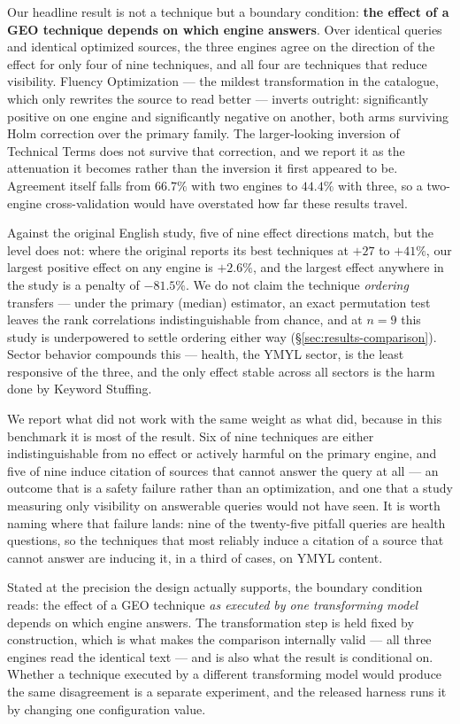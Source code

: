 \documentclass[11pt,a4paper]{article}
\begin{document}
Our headline result is not a technique but a boundary condition: \textbf{the
effect of a GEO technique depends on which engine answers}. Over identical
queries and identical optimized sources, the three engines agree on the
direction of the effect for only four of nine techniques, and all four are
techniques that reduce visibility. Fluency Optimization --- the mildest
transformation in the catalogue, which only rewrites the source to read
better --- inverts outright: significantly positive on one engine and
significantly negative on another, both arms surviving Holm correction over
the primary family. The larger-looking inversion of Technical Terms does not
survive that correction, and we report it as the attenuation it becomes
rather than the inversion it first appeared to be. Agreement itself falls from $66.7\%$ with two
engines to $44.4\%$ with three, so a two-engine cross-validation would have
overstated how far these results travel.

Against the original English study, five of nine effect directions match,
but the level does not: where the original reports its best techniques at
$+27$ to $+41\%$, our largest positive effect on any engine is $+2.6\%$, and
the largest effect anywhere in the study is a penalty of $-81.5\%$. We do
not claim the technique \emph{ordering} transfers --- under the primary
(median) estimator, an exact permutation test leaves the rank correlations
indistinguishable from chance, and at $n = 9$ this study is underpowered to
settle ordering either way (\S\ref{sec:results-comparison}). Sector
behavior compounds this --- health, the YMYL sector, is the least responsive
of the three, and the only effect stable across all sectors is the harm done
by Keyword Stuffing.

We report what did not work with the same weight as what did, because in
this benchmark it is most of the result. Six of nine techniques are
either indistinguishable from no effect or actively harmful on the primary
engine, and five of nine induce citation of sources that cannot answer the
query at all --- an outcome that is a safety failure rather than an
optimization, and one that a study measuring only visibility on answerable
queries would not have seen. It is worth naming where that failure lands:
nine of the twenty-five pitfall queries are health questions, so the
techniques that most reliably induce a citation of a source that cannot
answer are inducing it, in a third of cases, on YMYL content.

Stated at the precision the design actually supports, the boundary condition
reads: the effect of a GEO technique \emph{as executed by one transforming
model} depends on which engine answers. The transformation step is held
fixed by construction, which is what makes the comparison internally valid
--- all three engines read the identical text --- and is also what the
result is conditional on. Whether a technique executed by a different
transforming model would produce the same disagreement is a separate
experiment, and the released harness runs it by changing one configuration
value.
\end{document}
